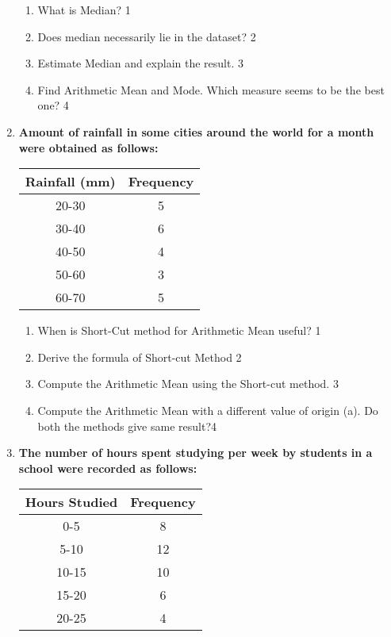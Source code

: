 \documentclass[a4paper,oneside]{book}
\begin{document}
\begin{enumerate}
  \begin{enumerate}
    \item
	What is Median? \hfill 1
    \item
	Does median necessarily lie in the dataset? \hfill 2
    \item  
	Estimate Median and explain the result. \hfill 3
    \item
	Find Arithmetic Mean and Mode. Which measure seems to be the best one? \hfill 4
  \end{enumerate}
  
   \item
	  \textbf{Amount of rainfall in some cities around the world for a month were obtained as follows:} 
	  
	      \begin{table}[h]
    \centering
\begin{tabular}{c|c}
\textbf{Rainfall (mm)} & \textbf{Frequency} \\ \hline
20-30                  & 5                  \\ \hline
30-40                  & 6                  \\ \hline
40-50                  & 4                  \\ \hline
50-60                  & 3                  \\
60-70                  & 5                 
\end{tabular}
\end{table}

    \begin{enumerate}
    \item
	When is Short-Cut method for Arithmetic Mean useful? \hfill 1
    \item
	Derive the formula of Short-cut Method \hfill 2
    \item  
	Compute the Arithmetic Mean using the Short-cut method. \hfill 3
    \item
	Compute the Arithmetic Mean with a different value of origin (a). Do both the methods give same result?\hfill 4
  \end{enumerate}
  
     \item
\textbf{The number of hours spent studying per week by students in a school were recorded as follows:}

\begin{table}[h]
\centering
\begin{tabular}{c|c}
\textbf{Hours Studied} & \textbf{Frequency} \\ \hline
0-5                   & 8                  \\ \hline
5-10                  & 12                 \\ \hline
10-15                 & 10                 \\ \hline
15-20                 & 6                  \\ \hline
20-25                 & 4                 
\end{tabular}
\end{table}


\end{enumerate}
\end{document}
